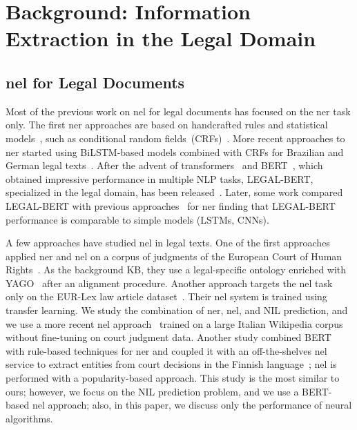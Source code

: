 \section{Background: Information Extraction in the Legal Domain}



\subsection{\ac{nel} for Legal Documents}

Most of the previous work on \ac{nel} for legal documents has focused on the \ac{ner} task only. The first \ac{ner} approaches are based on handcrafted rules and statistical models~\cite{ccetindaug2023name_legal_turkish}, such as conditional random fields~(CRFs)~\cite{Lafferty2001}. More recent approaches to \ac{ner} started using BiLSTM-based models combined with CRFs for Brazilian and German legal texts~\cite{ccetindaug2023name_legal_turkish}.
After the advent of transformers~\cite{vaswani_transformers_2017} and BERT~\cite{devlin-etal-2019-bert}, which obtained impressive performance in multiple NLP tasks, LEGAL-BERT, specialized in the legal domain, has been released~\cite{chalkidis-etal-2020-legal}. Later, some work compared LEGAL-BERT with previous approaches~\cite{Keshavarz2022} for \ac{ner} finding that LEGAL-BERT performance is comparable to simple models (LSTMs, CNNs). 

A few approaches have studied \ac{nel} in legal texts. One of the first approaches applied \ac{ner} and \ac{nel} on a corpus of judgments of the European Court of Human Rights~\cite{cardellino_etal_2017_lowcost}. As the background KB, they use a legal-specific ontology enriched with YAGO~\cite{mahdisoltani2013yago3,yago2_2013,yago2s_demo_2013,yago_core_2007} after an alignment procedure. Another approach targets the \ac{nel} task only on the EUR-Lex law article dataset~\cite{Elnaggar2018}. Their \ac{nel} system is trained using transfer learning. We study the combination of \ac{ner}, \ac{nel}, and NIL prediction, and we use a more recent \ac{nel} approach~\cite{blink} trained on a large Italian Wikipedia corpus without fine-tuning on court judgment data. Another study combined BERT~\cite{devlin-etal-2019-bert} with rule-based techniques for \ac{ner} and coupled it with an off-the-shelves \ac{nel} service to extract entities from court decisions in the Finnish language~\cite{Tamper2020}; \ac{nel} is performed with a popularity-based approach. This study is the most similar to ours; however, we focus on the NIL prediction problem, and we use a BERT-based \ac{nel} approach; also, in this paper, we discuss only the performance of neural algorithms. 

